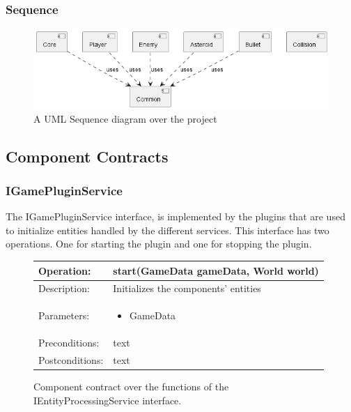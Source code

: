 \subsubsection{Sequence}
\begin{figure}[H]
    \includegraphics[width=\textwidth]{images/diagrams/component.png}
    \caption{A UML Sequence diagram over the project}
\end{figure}

\subsection{Component Contracts}
\subsubsection{IGamePluginService}
The IGamePluginService interface, is implemented by the plugins that are used to initialize entities handled by the different services.
This interface has two operations. One for starting the plugin and one for stopping the plugin.
\begin{figure}[H]
    \begin{center}
        \begin{tabulary}{1.0\textwidth}{lL}
            \toprule
            Operation:      & start(GameData gameData, World world) \\
            \midrule
            Description:     & Initializes the components' entities  \\
            \midrule
            Parameters:      & \begin{itemize}
                \item GameData
            \end{itemize}                                  \\
            \midrule
            Preconditions:   & text                                  \\
            \midrule
            Postconditions:  & text                                  \\
            \bottomrule
        \end{tabulary}
    \end{center}
    \caption{Component contract over the functions of the IEntityProcessingService interface.}
\end{figure}

